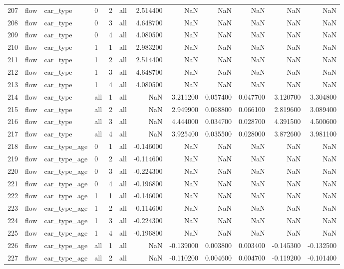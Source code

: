 \begin{tabular}{llllllrrrrrr}
207 & flow & car_type & 0 & 2 & all & 2.514400 & NaN & NaN & NaN & NaN & NaN \\
208 & flow & car_type & 0 & 3 & all & 4.648700 & NaN & NaN & NaN & NaN & NaN \\
209 & flow & car_type & 0 & 4 & all & 4.080500 & NaN & NaN & NaN & NaN & NaN \\
210 & flow & car_type & 1 & 1 & all & 2.983200 & NaN & NaN & NaN & NaN & NaN \\
211 & flow & car_type & 1 & 2 & all & 2.514400 & NaN & NaN & NaN & NaN & NaN \\
212 & flow & car_type & 1 & 3 & all & 4.648700 & NaN & NaN & NaN & NaN & NaN \\
213 & flow & car_type & 1 & 4 & all & 4.080500 & NaN & NaN & NaN & NaN & NaN \\
214 & flow & car_type & all & 1 & all & NaN & 3.211200 & 0.057400 & 0.047700 & 3.120700 & 3.304800 \\
215 & flow & car_type & all & 2 & all & NaN & 2.949900 & 0.068800 & 0.066100 & 2.819600 & 3.089400 \\
216 & flow & car_type & all & 3 & all & NaN & 4.444000 & 0.034700 & 0.028700 & 4.391500 & 4.500600 \\
217 & flow & car_type & all & 4 & all & NaN & 3.925400 & 0.035500 & 0.028000 & 3.872600 & 3.981100 \\
218 & flow & car_type_age & 0 & 1 & all & -0.146000 & NaN & NaN & NaN & NaN & NaN \\
219 & flow & car_type_age & 0 & 2 & all & -0.114600 & NaN & NaN & NaN & NaN & NaN \\
220 & flow & car_type_age & 0 & 3 & all & -0.224300 & NaN & NaN & NaN & NaN & NaN \\
221 & flow & car_type_age & 0 & 4 & all & -0.196800 & NaN & NaN & NaN & NaN & NaN \\
222 & flow & car_type_age & 1 & 1 & all & -0.146000 & NaN & NaN & NaN & NaN & NaN \\
223 & flow & car_type_age & 1 & 2 & all & -0.114600 & NaN & NaN & NaN & NaN & NaN \\
224 & flow & car_type_age & 1 & 3 & all & -0.224300 & NaN & NaN & NaN & NaN & NaN \\
225 & flow & car_type_age & 1 & 4 & all & -0.196800 & NaN & NaN & NaN & NaN & NaN \\
226 & flow & car_type_age & all & 1 & all & NaN & -0.139000 & 0.003800 & 0.003400 & -0.145300 & -0.132500 \\
227 & flow & car_type_age & all & 2 & all & NaN & -0.110200 & 0.004600 & 0.004700 & -0.119200 & -0.101400 \\

\end{tabular}
